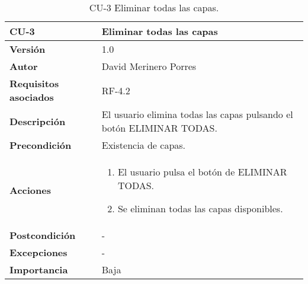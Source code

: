 \begin{table}[p]
	\centering
	\begin{tabularx}{\linewidth}{ p{} p{} }
		\toprule
		\textbf{CU-3}    & \textbf{Eliminar todas las capas}\\
		\toprule
		\textbf{Versión}              & 1.0    \\
		\textbf{Autor}                & David Merinero Porres \\
		\textbf{Requisitos asociados} & RF-4.2\\
		\textbf{Descripción}          & El usuario elimina todas las capas pulsando el botón ELIMINAR TODAS. \\
		\textbf{Precondición}         & Existencia de capas. \\
		\textbf{Acciones}             &
		\begin{enumerate}
			\def\labelenumi{\arabic{enumi}.}
			\tightlist
			\item El usuario pulsa el botón de ELIMINAR TODAS.
			\item Se eliminan todas las capas disponibles.
		\end{enumerate}\\
		\textbf{Postcondición}        & - \\
		\textbf{Excepciones}          & - \\
		\textbf{Importancia}          & Baja \\
		\bottomrule
	\end{tabularx}
	\caption{CU-3 Eliminar todas las capas.}
\end{table}

